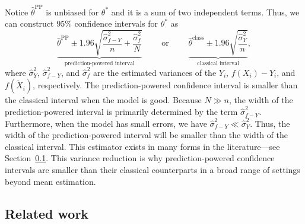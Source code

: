 \documentclass[10pt]{article}
\newcommand{\Xt}{\widetilde{X}}
\newcommand{\thetaclass}{\hat{\theta}^{\mathrm{class}}}
\newcommand{\thetaPP}{\hat{\theta}^{\mathrm{PP}}}
\begin{document}
Notice $\thetaPP$ is unbiased for $\theta^*$ and it is a sum of two independent terms. Thus, we can construct 95\% confidence intervals for $\theta^*$ as
\begin{equation}
    \label{eq:warmup-intervals}
    \underbrace{\thetaPP \pm 1.96 \sqrt{\frac{\hat{\sigma}^2_{f-Y}}{n} + \frac{\hat{\sigma}^2_{f}}{N}}}_{\text{prediction-powered interval}}
     \qquad \text{ or } \qquad  
     \underbrace{\thetaclass \pm 1.96 \sqrt{\frac{\hat{\sigma}^2_Y}{n}}}_{\text{classical interval}},
\end{equation}
where $\hat{\sigma}_Y^2$, $\hat{\sigma}^2_{f-Y}$, and $\hat{\sigma}^2_{f}$ are the estimated variances of the $Y_i$, $f(X_i)-Y_i$, and $f(\Xt_i)$, respectively. 
The prediction-powered confidence interval 
is smaller than the classical interval when the model is good.
Because $N \gg n$, the width of the prediction-powered interval is primarily determined by the term $\hat{\sigma}^2_{f-Y}$.
Furthermore, when the model has small errors, we have $\hat{\sigma}^2_{f-Y} \ll \hat{\sigma}^2_{Y}$. 
Thus, the width of the prediction-powered interval will be smaller than the width of the classical interval. This estimator exists in many forms in the literature---see Section~\ref{sec:lit_review}.
This variance reduction is why prediction-powered confidence intervals are smaller than their classical counterparts in a broad range of settings beyond mean estimation.


\subsection{Related work}
\label{sec:lit_review}
\end{document}
